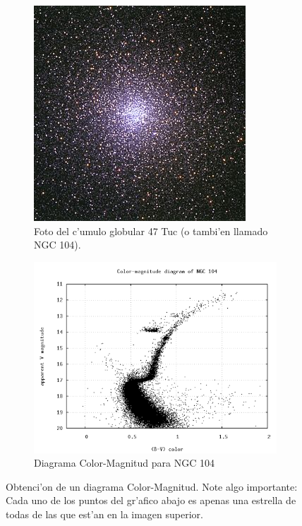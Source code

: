 \documentclass{article}
\begin{document}
\begin{enumerate}[a)]
\begin{figure} [h!]
\centering
\begin{subfigure}[b]{0.5\textwidth}
   \includegraphics[width=1\linewidth]{47_tuc.jpg}
   \caption{Foto del c'umulo globular 47 Tuc (o tambi'en llamado NGC 104).}
   \label{fig:Ng1} 
\end{subfigure}

\begin{subfigure}[b]{0.7\textwidth}
   \includegraphics[width=1\linewidth]{cmd_ngc_104.png}
   \caption{Diagrama Color-Magnitud para NGC 104}
   \label{fig:Ng2}
\end{subfigure}
\caption{Obtenci'on de un diagrama Color-Magnitud. Note algo importante: Cada uno de los puntos del gr'afico abajo es apenas una estrella de todas de las que est'an en la imagen superior.}
\label{hr}
\end{figure}


\end{enumerate}
\end{document}
